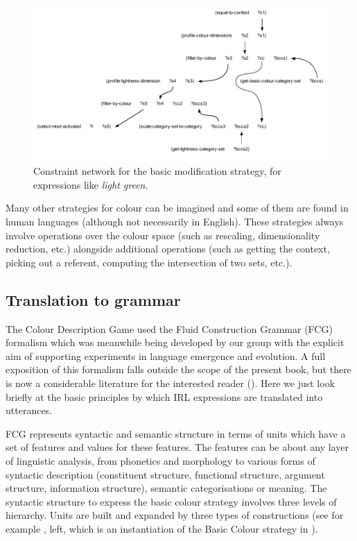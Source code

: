 \begin{figure}[htbp]
  \centerline{\includegraphics[width=1.0\textwidth]{chap11/figs/modi.pdf}}
\caption{\label{fig:modi}Constraint network for the basic modification strategy, for expressions like \textit{light green}.}
\end{figure}

Many other strategies for colour can be imagined and some of them are found in human languages (although not necessarily in English). 
These strategies always involve operations over the colour space (such as rescaling, dimensionality reduction, etc.) alongside 
additional operations (such as getting the context, picking out a referent, computing the intersection of two sets, etc.).

\subsection{Translation to grammar}

The Colour Description Game used the Fluid Construction Grammar (FCG) formalism which was meanwhile being developed by our 
group with the explicit aim of supporting experiments in language emergence and evolution. A full exposition of this 
formalism falls outside the scope of the present book, but there is now a considerable literature for the interested 
reader (\cite{Steels:2011}). Here we just look briefly at the basic principles by which IRL 
expressions are translated into utterances. 

FCG represents syntactic and semantic structure in terms of units which have a set of features and values for these 
features. The features can be about any layer of linguistic analysis, from phonetics and morphology to various 
forms of syntactic description (constituent structure, functional structure, argument structure, information structure), 
semantic categorisations or meaning. 
The syntactic structure to express the basic colour strategy involves three levels of hierarchy. Units are built 
and expanded by three types of constructions (see for example , left, which is an instantiation of 
the Basic Colour strategy in ). 

